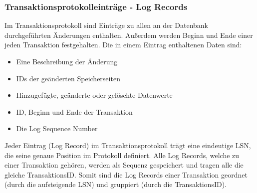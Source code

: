         \subsubsection{Transaktionsprotokolleinträge - Log Records}
          Im Transaktionsprotokoll sind Einträge zu allen an der Datenbank
          durchgeführten Änderungen enthalten. Außerdem werden Beginn und Ende einer
          jeden Transaktion festgehalten. Die in einem Eintrag enthaltenen Daten
          sind:
\clearpage
          \begin{itemize}
              \item Eine Beschreibung der Änderung
              \item IDs der geänderten Speicherseiten
              \item Hinzugefügte, geänderte oder gelöschte Datenwerte
              \item ID, Beginn und Ende der Transaktion
              \item Die Log Sequence Number
          \end{itemize}
          Jeder Eintrag (Log Record) im Transaktionsprotokoll trägt eine
          eindeutige LSN, die seine genaue Position im Protokoll definiert. Alle
          Log Records, welche zu einer Transaktion gehören, werden als Sequenz
          gespeichert und tragen alle die gleiche TransaktionsID. Somit sind die
          Log Records einer Transaktion geordnet (durch die aufsteigende LSN)
          und gruppiert (durch die TransaktionsID).
          
